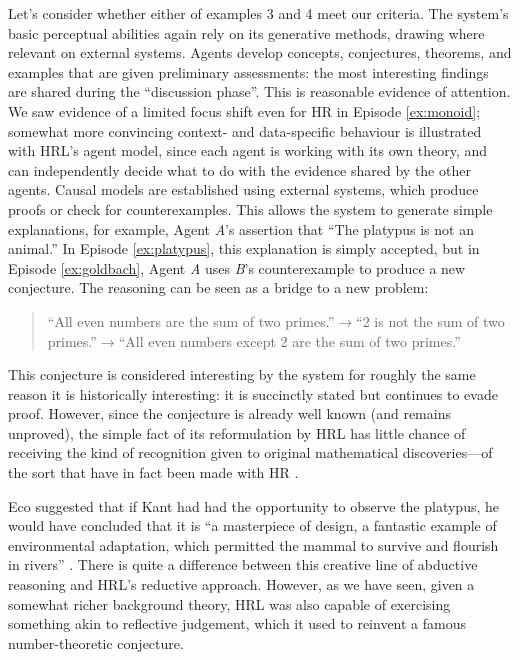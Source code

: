 Let's consider whether either of examples 3 and 4 meet our criteria.
The system's basic perceptual abilities again rely on its generative
methods, drawing where relevant on external systems.  Agents develop
concepts, conjectures, theorems, and examples that are given
preliminary assessments: the most interesting findings are shared
during the ``discussion phase''.  This is reasonable evidence of
attention.  We saw evidence of a limited focus shift even for {\sf HR}
in Episode \ref{ex:monoid}; somewhat more convincing context- and
data-specific behaviour is illustrated with {\sf HRL}'s agent model,
since each agent is working with its own theory, and can independently
decide what to do with the evidence shared by the other agents.
Causal models are established using external systems, which produce
proofs or check for counterexamples.  This allows the system to
generate simple explanations, for example, Agent \emph{A}'s assertion
that ``The platypus is not an animal.''
In Episode \ref{ex:platypus}, this explanation is simply accepted, but
in Episode \ref{ex:goldbach}, Agent \emph{A} uses \emph{B}'s
counterexample to produce a new conjecture.  The reasoning can be seen
as a bridge to a new problem:
\begin{quote}
``All even numbers are the sum of
two primes.''\:$\rightarrow$\:``2 is not the sum of two
primes.''\:$\rightarrow$\:``All even numbers except 2 are the sum of two
primes.'' 
\end{quote}
This conjecture is considered interesting by the system for roughly
the same reason it is historically interesting: it is succinctly
stated but continues to evade proof.  However, since the conjecture
is already well known (and remains unproved), the simple
fact of its reformulation by {\sf HRL} has little chance of 
receiving the kind of recognition given to original mathematical
discoveries---of the sort that have in fact been made with {\sf HR}
\cite{colton2007computational}.

Eco suggested that if Kant had had the opportunity to observe the platypus, he would have concluded that it is ``a masterpiece of design, a fantastic example of environmental adaptation, which permitted the mammal to survive and flourish in rivers'' \cite[p.~93]{eco2000kant}.  There is quite a difference between this creative line of abductive reasoning and {\sf HRL}'s reductive approach.  However, as we have seen, given a somewhat richer background theory, {\sf HRL} was also capable of exercising something akin to reflective judgement, which it used to reinvent a famous number-theoretic conjecture.
